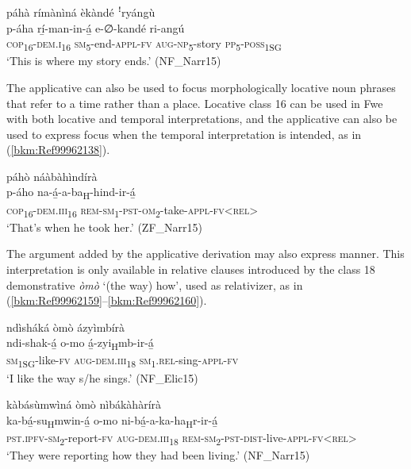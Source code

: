 \ea
\label{bkm:Ref506371955}
páhà rímànìná èkàndé ꜝryángù\\
\gll p-áha      rí̲-man-in-á̲    e-∅-kandé    ri-angú\\
\textsc{cop}\textsubscript{16}-\textsc{dem}.\textsc{i}\textsubscript{16}  \textsc{sm}\textsubscript{5}-end-\textsc{appl}-\textsc{fv}  \textsc{aug}-\textsc{np}\textsubscript{5}-story  \textsc{pp}\textsubscript{5}-\textsc{poss}\textsubscript{1SG}\\
\glt ‘This is where my story ends.’ (NF\_Narr15)
\z

\hspace*{-3.7pt}The applicative can also be used to focus morphologically locative noun phrases that refer to a time rather than a place. Locative class 16 can be used in Fwe with both locative and temporal interpretations, and the applicative can also be used to express focus when the temporal interpretation is intended, as in (\ref{bkm:Ref99962138}).

\ea
\label{bkm:Ref99962138}
páhò náàbàhìndírà\\
\gll p-áho      na-á̲-a-ba\textsubscript{H}-hind-ir-á̲\\
\textsc{cop}\textsubscript{16}-\textsc{dem}.\textsc{iii}\textsubscript{16}  \textsc{rem}-\textsc{sm}\textsubscript{1}-\textsc{pst}-\textsc{om}\textsubscript{2}-take-\textsc{appl}-\textsc{fv}<\textsc{rel}>\\
\glt ‘That’s when he took her.’ (ZF\_Narr15)
\z

The argument added by the applicative derivation may also express manner. This interpretation is only available in relative clauses introduced by the class 18 demonstrative \textit{òmò} ‘(the way) how’, used as relativizer, as in (\ref{bkm:Ref99962159}--\ref{bkm:Ref99962160}).

\ea
\label{bkm:Ref99962159}
ndìsháká òmò ázyìmbírà\\
\gll ndi-shak-á̲    o-mo    á̲-zyi\textsubscript{H}mb-ir-á̲\\
\textsc{sm}\textsubscript{1SG}-like-\textsc{fv}  \textsc{aug}-\textsc{dem}.\textsc{iii}\textsubscript{18}  \textsc{sm}\textsubscript{1}.\textsc{rel}-sing-\textsc{appl}-\textsc{fv}\\
\glt ‘I like the way s/he sings.’ (NF\_Elic15)
\z

\ea
kàbásùmwìná òmò nìbákàhàrírà\\
\gll ka-bá̲-su\textsubscript{H}mwin-á̲    o-mo      ni-bá̲-a-ka-ha\textsubscript{H}r-ir-á̲\\
\textsc{pst}.\textsc{ipfv}-\textsc{sm}\textsubscript{2}-report-\textsc{fv}  \textsc{aug}-\textsc{dem}.\textsc{iii}\textsubscript{18}  \textsc{rem}-\textsc{sm}\textsubscript{2}-\textsc{pst}-\textsc{dist}-live-\textsc{appl}-\textsc{fv}<\textsc{rel}>\\
\glt ‘They were reporting how they had been living.’ (NF\_Narr15)
\z

